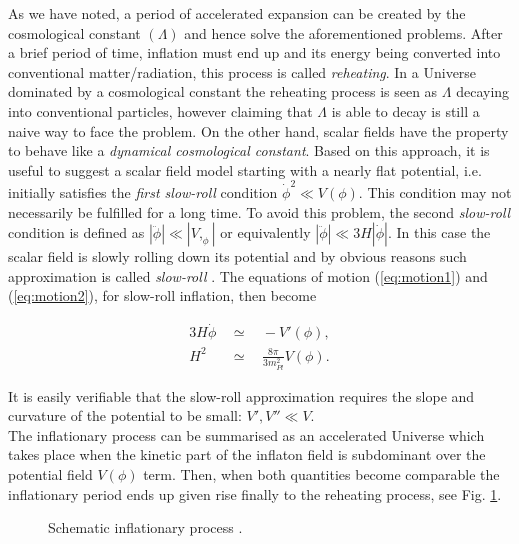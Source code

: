 \documentclass{rmaa}
\def\bea{\begin{eqnarray}}
\def\eea{\end{eqnarray}}
\begin{document}
As we have noted, a period of accelerated expansion can be created by 
the cosmological constant $(\Lambda)$ and hence solve the aforementioned problems.
After a brief period of time, inflation must end up and its energy being converted into conventional
matter/radiation, this process is called \textit{reheating}. In a Universe dominated by a 
cosmological constant the reheating process is seen as $\Lambda$ decaying into 
conventional particles, however claiming that $\Lambda$ is able to decay is still a 
naive way to face the problem.   
%
On the other hand, scalar fields have the property to behave like a 
\textit{dynamical cosmological constant}. Based on this approach, it is useful to
suggest a scalar field model starting with a nearly flat potential, i.e. initially 
satisfies the \textit{first slow-roll} condition $\dot \phi^2 \ll V(\phi)$. 
This condition may not necessarily be fulfilled for a long time.
To avoid this problem, the second \textit{slow-roll} condition is defined as 
$|\ddot{\phi}|\ll |V,_{\phi}|$ or equivalently $|\ddot{\phi}|\ll 3H|\dot{\phi}|$. In this case the scalar field is slowly rolling 
down its potential and by obvious reasons such approximation is called \textit{slow-roll} 
\citep{Liddle92, Liddle94}.
The equations of motion (\ref{eq:motion1}) 
 and (\ref{eq:motion2}), for slow-roll inflation, then become
 
\bea \label{eq:slow}
3H\dot{\phi} ~~ &\simeq& ~~ -V'(\phi), \\
H^2 ~~ & \simeq& ~~ \frac{8\pi}{3m^2_{Pl}} V(\phi). \label{eq:slow2}
\eea

\noindent
It is easily verifiable that the slow-roll approximation requires the slope 
and curvature of the potential to be small: $V', V'' \ll V$.
\\

The inflationary process can be summarised as an accelerated Universe which takes place when 
the kinetic part of the inflaton field is subdominant over the potential field $V(\phi)$ term. 
Then, when both quantities become comparable the inflationary period ends up given 
rise finally to the reheating process, see Fig. \ref{fig:Field}. 


\begin{figure}[ht] 
\centerline{ \epsfxsize=180pt  }
\caption{Schematic inflationary process \citep{Baumann}.}
\label{fig:Field}
\end{figure}
\end{document}
